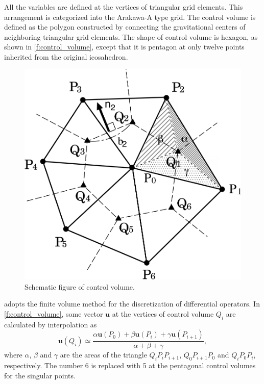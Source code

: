 All the variables are defined at the vertices of triangular grid
elements.
%
This arrangement is categorized into the Arakawa-A type grid.
%
The control volume is defined as the polygon constructed by connecting
the gravitational centers of neighboring triangular grid elements.
%
The shape of control volume is hexagon, as shown in 
\autoref{f:control_volume}, except that it is pentagon at only twelve points
inherited from the original icosahedron.

\begin{figure}[tb]
 \centering
\includegraphics[scale=0.7]{figs/Tomita1-27-0.png}
 \caption{Schematic figure of control volume. \citep{Tomita:2008jc}}
 \label{f:control_volume}
\end{figure}


\NICAM adopts the finite volume method for the discretization of
differential operators.
%
In \autoref{f:control_volume}, some vector $\bm{u}$
at the vertices of control volume $Q_i$ are calculated by interpolation
as\footnotemark
%
%
\begin{equation}
 \bm{u} (Q_i) \simeq
 \frac{\alpha \bm{u}(P_0) + \beta \bm{u}(P_i) + \gamma \bm{u}(P_{i+1})}
      {\alpha + \beta + \gamma} ,\label{e:u_Q_i}
\end{equation}
%
where $\alpha$, $\beta$ and $\gamma$ are the areas of the triangle
$Q_i P_i P_{i+1}$, $Q_0 P_{i+1} P_0$ and $Q_i P_0 P_i$, respectively.
%
The number 6 is replaced with 5 at the pentagonal control volumes for
the singular points.

